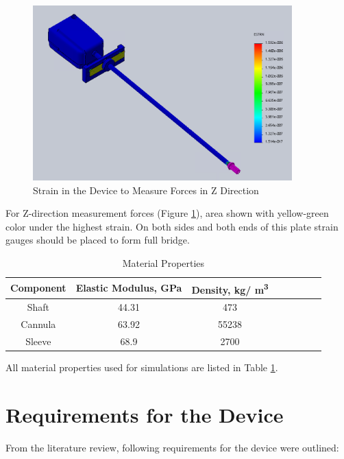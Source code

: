 \begin{figure}[h]
	\begin{center}
		\includegraphics[width=100mm]{fig/methods/z_dir_sim.png}
	\end{center}
	\vspace{-4mm}
	\caption[Z device]
	{Strain in the Device to Measure Forces in Z Direction}
	\label{fig:Zdev}
	\vspace{-2mm}
\end{figure}

For Z-direction measurement forces (Figure \ref{fig:Zdev}), area shown with yellow-green color under the highest strain. On both sides and both ends of this plate strain gauges should be placed to form full bridge.

\begin{table}
\caption {Material Properties} \label{tab:matProp} 
\begin{center}
\begin{tabular}{ | c | c | c | c | c | c | c | c | } 
\hline
Component & Elastic Modulus, GPa & Density, kg/ m\textsuperscript{3} \\ 
\hline
Shaft & 44.31 & 473\\ 
\hline
Cannula & 63.92 & 55238 \\ 
\hline
Sleeve & 68.9 & 2700  \\ 
\hline
\end{tabular}
\end{center}
\end{table}

All material properties used for simulations are listed in Table \ref{tab:matProp}.

\section{Requirements for the Device}
	\label{sec:DevReq}
	From the literature review, following requirements for the device were outlined:
	
